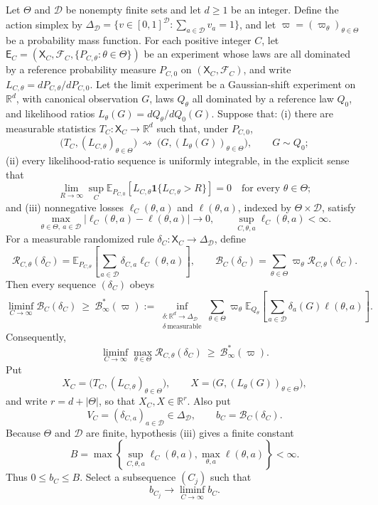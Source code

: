 Let \(\Theta\) and \(\mathcal D\) be nonempty finite sets and let \(d\geq1\) be an integer.  Define the action simplex by \(\Delta_{\mathcal D}=\{v\in[0,1]^{\mathcal D}:\sum_{a\in\mathcal D}v_a=1\}\), and let \(\varpi=(\varpi_\theta)_{\theta\in\Theta}\) be a probability mass function.  For each positive integer \(C\), let \(\mathsf E_C=(\mathsf X_C,\mathcal F_C,\{P_{C,\theta}:\theta\in\Theta\})\) be an experiment whose laws are all dominated by a reference probability measure \(P_{C,0}\) on \((\mathsf X_C,\mathcal F_C)\), and write \(L_{C,\theta}=dP_{C,\theta}/dP_{C,0}\).  Let the limit experiment be a Gaussian-shift experiment on \(\mathbb R^d\), with canonical observation \(G\), laws \(Q_\theta\) all dominated by a reference law \(Q_0\), and likelihood ratios \(L_\theta(G)=dQ_\theta/dQ_0(G)\).  Suppose that: (i) there are measurable statistics \(T_C\colon\mathsf X_C\to\mathbb R^d\) such that, under \(P_{C,0}\),
\[
 \bigl(T_C,(L_{C,\theta})_{\theta\in\Theta}\bigr)
 \ \rightsquigarrow\ 
 \bigl(G,(L_\theta(G))_{\theta\in\Theta}\bigr),
 \qquad G\sim Q_0;
\]
(ii) every likelihood-ratio sequence is uniformly integrable, in the explicit sense that
\[
 \lim_{R\to\infty}\sup_C
 \mathbb E_{P_{C,0}}\!\left[L_{C,\theta}
 \mathbf 1\{L_{C,\theta}>R\}\right]=0
 \quad\text{for every }\theta\in\Theta;
\]
and (iii) nonnegative losses \(\ell_C(\theta,a)\) and \(\ell(\theta,a)\), indexed by \(\Theta\times\mathcal D\), satisfy
\[
 \max_{\theta\in\Theta,\ a\in\mathcal D}
 |\ell_C(\theta,a)-\ell(\theta,a)|\longrightarrow0,
 \qquad
 \sup_{C,\theta,a}\ell_C(\theta,a)<\infty.
\]
For a measurable randomized rule \(\delta_C\colon\mathsf X_C\to\Delta_{\mathcal D}\), define
\[
 \mathcal R_{C,\theta}(\delta_C)
 =\mathbb E_{P_{C,\theta}}\!\left[
   \sum_{a\in\mathcal D}\delta_{C,a}\ell_C(\theta,a)
 \right],
 \qquad
 \mathcal B_C(\delta_C)=\sum_{\theta\in\Theta}\varpi_\theta
 \mathcal R_{C,\theta}(\delta_C).
\]
Then every sequence \((\delta_C)\) obeys
\[
 \liminf_{C\to\infty}\mathcal B_C(\delta_C)
 \ \geq\ 
 \mathcal B_\infty^*(\varpi)
 :=\inf_{\substack{\delta\colon\mathbb R^d\to\Delta_{\mathcal D}\\
                    \delta\ \mathrm{measurable}}}
 \sum_{\theta\in\Theta}\varpi_\theta
 \mathbb E_{Q_\theta}\!\left[
   \sum_{a\in\mathcal D}\delta_a(G)\ell(\theta,a)
 \right].
\]
Consequently,
\[
 \liminf_{C\to\infty}\max_{\theta\in\Theta}
 \mathcal R_{C,\theta}(\delta_C)
 \ \geq\ \mathcal B_\infty^*(\varpi).
\]
Put
\[
 X_C=\bigl(T_C,(L_{C,\theta})_{\theta\in\Theta}\bigr),
 \qquad
 X=\bigl(G,(L_\theta(G))_{\theta\in\Theta}\bigr),
\]
and write \(r=d+|\Theta|\), so that \(X_C,X\in\mathbb R^r\).  Also put
\[
 V_C=(\delta_{C,a})_{a\in\mathcal D}\in\Delta_{\mathcal D},
 \qquad
 b_C=\mathcal B_C(\delta_C).
\]
Because \(\Theta\) and \(\mathcal D\) are finite, hypothesis (iii) gives a finite constant
\[
 B=\max\left\{
       \sup_{C,\theta,a}\ell_C(\theta,a),
       \max_{\theta,a}\ell(\theta,a)
     \right\}<\infty.
 \tag{1}
\]
Thus \(0\leq b_C\leq B\).  Select a subsequence \((C_j)\) such that
\[
 b_{C_j}\longrightarrow\liminf_{C\to\infty}b_C.
 \tag{2}
\]

